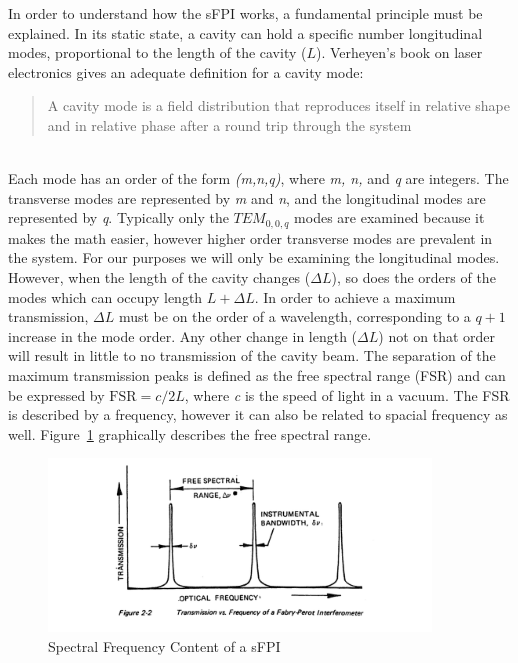 \documentclass[12pt,journal]{IEEEtran}
\begin{document}
In order to understand how the sFPI works, a fundamental principle must be explained. In its static state, a cavity can hold a specific number longitudinal modes, proportional to the length of the cavity ($L$). Verheyen's book on laser electronics gives an adequate definition for a cavity mode:
\\
\begin{quote}
A cavity mode is a field distribution that reproduces itself in relative shape and in relative phase after a round trip through the system~\cite{verdeyen}
\end{quote}
\leavevmode \\
\indent Each mode has an order of the form \textit{(m,n,q)}, where \textit{m, n,} and \textit{q} are integers. The transverse modes are represented by \textit{m} and \textit{n}, and the longitudinal modes are represented by \textit{q}. Typically only the $TEM_{0,0,q}$ modes are examined because it makes the math easier, however higher order transverse modes are prevalent in the system. For our purposes we will only be examining the longitudinal modes. However, when the length of the cavity changes ($\Delta L$), so does the orders of the modes which can occupy length $L+\Delta L$. In order to achieve a maximum transmission, $\Delta L$ must be on the order of a wavelength, corresponding to a $q+1$ increase in the mode order. Any other change in length ($\Delta L$) not on that order will result in little to no transmission of the cavity beam. The separation of the maximum transmission peaks is defined as the free spectral range (FSR) and can be expressed by $\text{FSR}=c/2L$, where \textit{c} is the speed of light in a vacuum. The FSR is described by a frequency, however it can also be related to spacial frequency as well. Figure~\ref{fig:fsr} graphically describes the free spectral range. 

\begin{figure}
	\centering
	\includegraphics[width=4in]{./FSR_1.png}
	\caption{Spectral Frequency Content of a sFPI~\cite{spectraphysics450}}
	\label{fig:fsr}
\end{figure}
\end{document}

